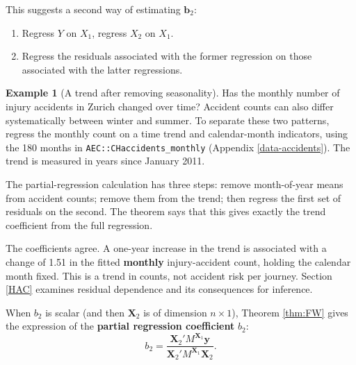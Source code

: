 \documentclass[
  11pt,
]{book}
\providecommand{\tightlist}{%
  \setlength{\itemsep}{0pt}\setlength{\parskip}{0pt}}
\theoremstyle{definition}
\theoremstyle{definition}
\newtheorem{example}{Example}[chapter]
\theoremstyle{definition}
\theoremstyle{definition}
\theoremstyle{remark}
\begin{document}
This suggests a second way of estimating \(\mathbf{b}_2\):

\begin{enumerate}
\def\labelenumi{\arabic{enumi}.}
\tightlist
\item
  Regress \(Y\) on \(X_1\), regress \(X_2\) on \(X_1\).
\item
  Regress the residuals associated with the former regression on those associated with the latter regressions.
\end{enumerate}

\begin{example}[A trend after removing seasonality]
\protect\hypertarget{exm:accident-seasonality}{}\label{exm:accident-seasonality}Has the monthly number of injury accidents in Zurich changed over time? Accident counts can also differ systematically between winter and summer. To separate these two patterns, regress the monthly count on a time trend and calendar-month indicators, using the 180 months in \texttt{AEC::CHaccidents\_monthly} (Appendix \ref{data-accidents}). The trend is measured in years since January 2011.

The partial-regression calculation has three steps: remove month-of-year means from accident counts; remove them from the trend; then regress the first set of residuals on the second. The theorem says that this gives exactly the trend coefficient from the full regression.

\begin{table}[H]
\centering\begingroup\fontsize{10}{12}\selectfont

\endgroup{}
\end{table}

The coefficients agree. A one-year increase in the trend is associated with a change of 1.51 in the fitted \textbf{monthly} injury-accident count, holding the calendar month fixed. This is a trend in counts, not accident risk per journey. Section \ref{HAC} examines residual dependence and its consequences for inference.
\end{example}

When \(b_2\) is scalar (and then \(\mathbf{X}_2\) is of dimension \(n \times 1\)), Theorem \ref{thm:FW} gives the expression of the \textbf{partial regression coefficient} \(b_2\):
\[
b_2 = \frac{\mathbf{X}_2'M^{\mathbf{X}_1}\mathbf{y}}{\mathbf{X}_2'M^{\mathbf{X}_1}\mathbf{X}_2}.
\]
\end{document}
